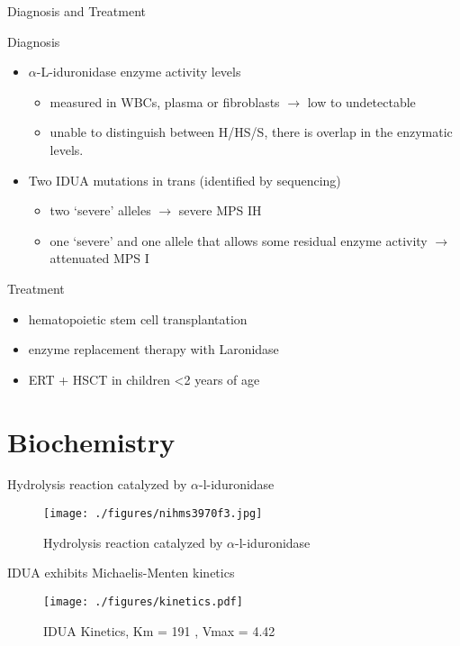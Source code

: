\documentclass[presentation, smaller]{beamer}
\begin{document}
\begin{frame}[label={sec:orgheadline3}]{Diagnosis and Treatment}
\begin{block}{Diagnosis}
\begin{itemize}
\item \(\alpha\)-L-iduronidase enzyme activity levels
\begin{itemize}
\item measured in WBCs, plasma or fibroblasts \(\to\) low to undetectable
\item unable to distinguish between H/HS/S, there is overlap in the enzymatic levels.
\end{itemize}
\item Two ​IDUA mutations in trans (identified by sequencing)
\begin{itemize}
\item two ‘severe’ alleles \(\to\) severe MPS IH
\item one ‘severe’ and one allele that allows some residual enzyme
activity \(\to\) attenuated MPS I
\end{itemize}
\end{itemize}
\end{block}

\begin{block}{Treatment}
\begin{itemize}
\item hematopoietic stem cell transplantation
\item enzyme replacement therapy with Laronidase
\item ERT + HSCT in children <2 years of age
\end{itemize}
\end{block}
\end{frame}


\section{Biochemistry}
\label{sec:orgheadline8}
\begin{frame}[label={sec:orgheadline5}]{Hydrolysis reaction catalyzed by \(\alpha\)-l-iduronidase}
\begin{figure}[htb]
\centering
\texttt{[image: ./figures/nihms3970f3.jpg]}
\caption[mech]{\label{fig:mech}
Hydrolysis reaction catalyzed by \(\alpha\)-l-iduronidase}
\end{figure}
\end{frame}

\begin{frame}[label={sec:orgheadline6}]{IDUA exhibits Michaelis-Menten kinetics}
\begin{figure}[htb]
\centering
\texttt{[image: ./figures/kinetics.pdf]}
\caption{\label{fig:mm}
IDUA Kinetics, Km = 191 , Vmax = 4.42}
\end{figure}
\end{frame}
\end{document}
